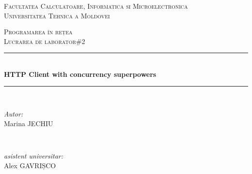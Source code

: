 \begin{titlepage}

  \begin{center} %

  \textsc{\large Facultatea Calculatoare, Informatica si Microelectronica}\\[0.5cm]
  \textsc{\large Universitatea Tehnica a Moldovei}\\[1.2cm] %
  \vspace{25 mm}

  \textsc{\Large Programarea în rețea}\\[0.5cm] %
  \textsc{\large Lucrarea de laborator\#2}\\[0.5cm] %

\newcommand{\HRule}{\rule{\linewidth}{0.5mm}} %

  \vspace{10 mm}
  \HRule \\[0.4cm]
  { \LARGE \bfseries HTTP Client with concurrency superpowers  }\\[0.4cm] %
  \HRule \\[1.5cm]

      \vspace{30mm}

      \begin{minipage}{0.4\textwidth}
      \begin{flushleft} \large
      \emph{Autor:}\\
      Marina \textsc{JECHIU}
      \end{flushleft}
      \end{minipage}
      ~
      \begin{minipage}{0.4\textwidth}
      \begin{flushright} \large
      \emph{asistent universitar:} \\
      Alex \textsc{GAVRIȘCO} \\ %
      \end{flushright}
      \end{minipage}\\[4cm]


\end{center}
\end{titlepage}
